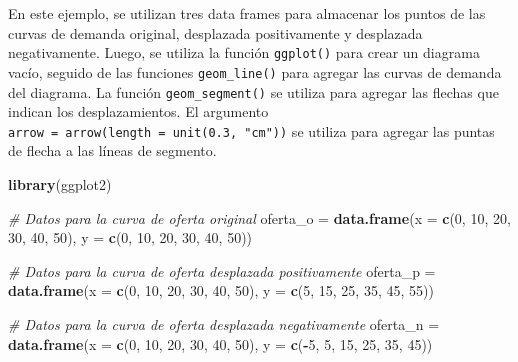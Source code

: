 \documentclass[
  spanish,
  12pt,
]{book}
\newenvironment{Shaded}{\begin{snugshade}}{\end{snugshade}}
\newcommand{\AttributeTok}[1]{\textcolor[rgb]{0.13,0.29,0.53}{#1}}
\newcommand{\CommentTok}[1]{\textcolor[rgb]{0.56,0.35,0.01}{\textit{#1}}}
\newcommand{\DecValTok}[1]{\textcolor[rgb]{0.00,0.00,0.81}{#1}}
\newcommand{\FunctionTok}[1]{\textcolor[rgb]{0.13,0.29,0.53}{\textbf{#1}}}
\newcommand{\NormalTok}[1]{#1}
\newcommand{\OtherTok}[1]{\textcolor[rgb]{0.56,0.35,0.01}{#1}}
\newcommand{\SpecialCharTok}[1]{\textcolor[rgb]{0.81,0.36,0.00}{\textbf{#1}}}
\begin{document}
En este ejemplo, se utilizan tres data frames para almacenar los puntos
de las curvas de demanda original, desplazada positivamente y desplazada
negativamente. Luego, se utiliza la función \texttt{ggplot()} para crear
un diagrama vacío, seguido de las funciones \texttt{geom\_line()} para
agregar las curvas de demanda del diagrama. La función
\texttt{geom\_segment()} se utiliza para agregar las flechas que indican
los desplazamientos. El argumento
\texttt{arrow\ =\ arrow(length\ =\ unit(0.3,\ "cm"))} se utiliza para
agregar las puntas de flecha a las líneas de segmento.

\newpage

\begin{Shaded}
\begin{Highlighting}[]
\FunctionTok{library}\NormalTok{(ggplot2)}

\CommentTok{\# Datos para la curva de oferta original}
\NormalTok{oferta\_o }\OtherTok{=} \FunctionTok{data.frame}\NormalTok{(}\AttributeTok{x =} \FunctionTok{c}\NormalTok{(}\DecValTok{0}\NormalTok{, }\DecValTok{10}\NormalTok{, }\DecValTok{20}\NormalTok{, }\DecValTok{30}\NormalTok{, }\DecValTok{40}\NormalTok{, }\DecValTok{50}\NormalTok{), }
                      \AttributeTok{y =} \FunctionTok{c}\NormalTok{(}\DecValTok{0}\NormalTok{, }\DecValTok{10}\NormalTok{, }\DecValTok{20}\NormalTok{, }\DecValTok{30}\NormalTok{, }\DecValTok{40}\NormalTok{, }\DecValTok{50}\NormalTok{))}

\CommentTok{\# Datos para la curva de oferta desplazada positivamente}
\NormalTok{oferta\_p }\OtherTok{=} \FunctionTok{data.frame}\NormalTok{(}\AttributeTok{x =} \FunctionTok{c}\NormalTok{(}\DecValTok{0}\NormalTok{, }\DecValTok{10}\NormalTok{, }\DecValTok{20}\NormalTok{, }\DecValTok{30}\NormalTok{, }\DecValTok{40}\NormalTok{, }\DecValTok{50}\NormalTok{), }
                      \AttributeTok{y =} \FunctionTok{c}\NormalTok{(}\DecValTok{5}\NormalTok{, }\DecValTok{15}\NormalTok{, }\DecValTok{25}\NormalTok{, }\DecValTok{35}\NormalTok{, }\DecValTok{45}\NormalTok{, }\DecValTok{55}\NormalTok{))}

\CommentTok{\# Datos para la curva de oferta desplazada negativamente}
\NormalTok{oferta\_n }\OtherTok{=} \FunctionTok{data.frame}\NormalTok{(}\AttributeTok{x =} \FunctionTok{c}\NormalTok{(}\DecValTok{0}\NormalTok{, }\DecValTok{10}\NormalTok{, }\DecValTok{20}\NormalTok{, }\DecValTok{30}\NormalTok{, }\DecValTok{40}\NormalTok{, }\DecValTok{50}\NormalTok{), }
                      \AttributeTok{y =} \FunctionTok{c}\NormalTok{(}\SpecialCharTok{{-}}\DecValTok{5}\NormalTok{, }\DecValTok{5}\NormalTok{, }\DecValTok{15}\NormalTok{, }\DecValTok{25}\NormalTok{, }\DecValTok{35}\NormalTok{, }\DecValTok{45}\NormalTok{))}


\end{Highlighting}
\end{Shaded}
\end{document}
